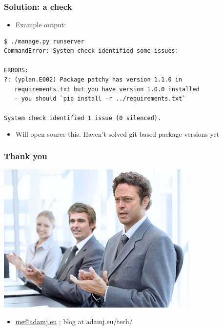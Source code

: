 \documentclass{beamer}
\begin{document}
\begin{frame}[fragile]\frametitle{Solution: a check}

    \begin{itemize}
        \item Example output:
    \end{itemize}

    \begin{lstlisting}
$ ./manage.py runserver
CommandError: System check identified some issues:

ERRORS:
?: (yplan.E002) Package patchy has version 1.1.0 in
   requirements.txt but you have version 1.0.0 installed
   - you should `pip install -r ../requirements.txt`

System check identified 1 issue (0 silenced).
    \end{lstlisting}

    \begin{itemize}
        \item Will open-source this. Haven't solved git-based package versions yet
    \end{itemize}

\end{frame}



\begin{frame}[fragile]\frametitle{Thank you}

    \begin{center}
        \includegraphics[width=10cm]{clapping}
    \end{center}

    \begin{itemize}
        \item \url{me@adamj.eu} ; blog at adamj.eu/tech/
    \end{itemize}

\end{frame}
\end{document}
